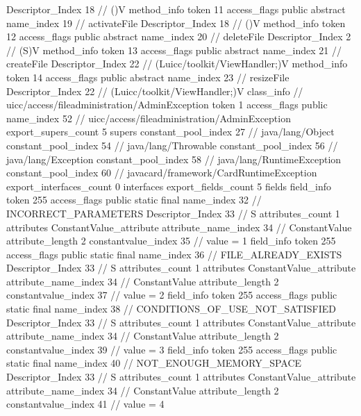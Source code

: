 {{{{{					Descriptor_Index	18		// ()V
				}
				method_info {
					token	11
					access_flags	public abstract
					name_index	19		// activateFile
					Descriptor_Index	18		// ()V
				}
				method_info {
					token	12
					access_flags	public abstract
					name_index	20		// deleteFile
					Descriptor_Index	2		// (S)V
				}
				method_info {
					token	13
					access_flags	public abstract
					name_index	21		// createFile
					Descriptor_Index	22		// (Luicc/toolkit/ViewHandler;)V
				}
				method_info {
					token	14
					access_flags	public abstract
					name_index	23		// resizeFile
					Descriptor_Index	22		// (Luicc/toolkit/ViewHandler;)V
				}
			}
		}
		class_info {		// uicc/access/fileadministration/AdminException
			token	1
			access_flags	public
			name_index	52		// uicc/access/fileadministration/AdminException
			export_supers_count	5
			supers {
				constant_pool_index	27		// java/lang/Object
				constant_pool_index	54		// java/lang/Throwable
				constant_pool_index	56		// java/lang/Exception
				constant_pool_index	58		// java/lang/RuntimeException
				constant_pool_index	60		// javacard/framework/CardRuntimeException
			}
			export_interfaces_count	0
			interfaces {
			}
			export_fields_count	5
			fields {
			field_info {
				token	255
				access_flags	public static final
				name_index	32		// INCORRECT_PARAMETERS
				Descriptor_Index	33		// S
				attributes_count	1
				attributes {
				ConstantValue_attribute {
					attribute_name_index	34		// ConstantValue
					attribute_length	2
					constantvalue_index	35		// value = 1
				}
				}
			}
			field_info {
				token	255
				access_flags	public static final
				name_index	36		// FILE_ALREADY_EXISTS
				Descriptor_Index	33		// S
				attributes_count	1
				attributes {
				ConstantValue_attribute {
					attribute_name_index	34		// ConstantValue
					attribute_length	2
					constantvalue_index	37		// value = 2
				}
				}
			}
			field_info {
				token	255
				access_flags	public static final
				name_index	38		// CONDITIONS_OF_USE_NOT_SATISFIED
				Descriptor_Index	33		// S
				attributes_count	1
				attributes {
				ConstantValue_attribute {
					attribute_name_index	34		// ConstantValue
					attribute_length	2
					constantvalue_index	39		// value = 3
				}
				}
			}
			field_info {
				token	255
				access_flags	public static final
				name_index	40		// NOT_ENOUGH_MEMORY_SPACE
				Descriptor_Index	33		// S
				attributes_count	1
				attributes {
				ConstantValue_attribute {
					attribute_name_index	34		// ConstantValue
					attribute_length	2
					constantvalue_index	41		// value = 4
				}
				}
}}}}}

